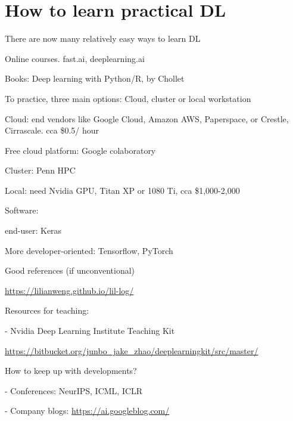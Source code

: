 \documentclass[english]{article}
\begin{document}
\eenum 

\section{How to learn practical DL}
%
%
\bitem
\item There are now many relatively easy ways to learn DL
\bitem

\item Online courses. fast.ai, deeplearning.ai
\item Books: Deep learning with Python/R, by Chollet 
\eitem

\item To practice, three main options: Cloud, cluster or local workstation
\bitem
\item Cloud: end vendors like Google Cloud, Amazon AWS, Paperspace, or Crestle, Cirrascale. cca \$0.5/ hour
\item Free cloud platform: Google colaboratory
\item Cluster: Penn HPC
\item Local: need Nvidia GPU, Titan XP or 1080 Ti, cca \$1,000-2,000

\eitem
\item Software: 
\bitem
\item end-user: Keras
\item More developer-oriented: Tensorflow, PyTorch
\eitem

\item Good references (if unconventional)

\url{https://lilianweng.github.io/lil-log/}


\item Resources for teaching: 

- Nvidia Deep Learning Institute Teaching Kit

\url{https://bitbucket.org/junbo_jake_zhao/deeplearningkit/src/master/}

\item How to keep up with developments?

- Conferences: NeurIPS, ICML, ICLR

- Company blogs: \url{https://ai.googleblog.com/}

\eitem
\end{document}
